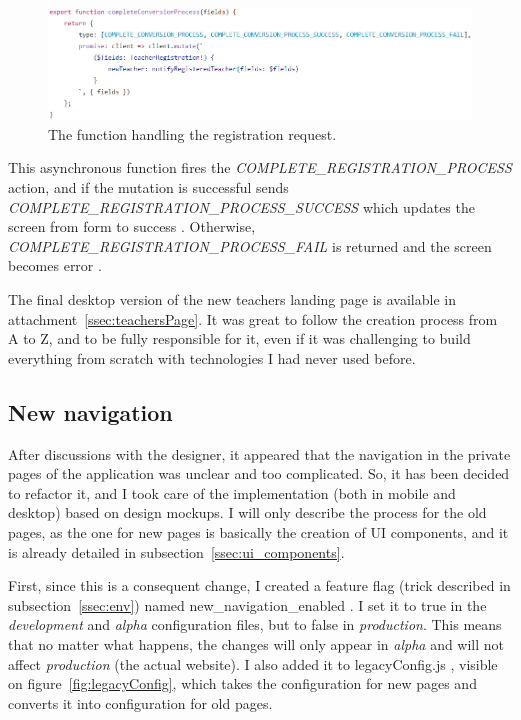 \begin{figure}[H]
    \centering
    \includegraphics[scale=0.8]{figure/completeRegistration.png}
    \caption{The function handling the registration request.}
    \label{fig:completeRegistration}
\end{figure}

This asynchronous function fires the \textit{COMPLETE\_REGISTRATION\_PROCESS} action, and if the mutation is successful sends \textit{COMPLETE\_REGISTRATION\_PROCESS\_SUCCESS} which updates the screen from \guillemotleft{} form \guillemotright{} to \guillemotleft{} success \guillemotright{}. Otherwise, \textit{COMPLETE\_REGISTRATION\_PROCESS\_FAIL} is returned and the screen becomes \guillemotleft{} error \guillemotright{}.

The final desktop version of the new teachers landing page is available in {\sc attachment}~\ref{ssec:teachersPage}. It was great to follow the creation process from A to Z, and to be fully responsible for it, even if it was challenging to build everything from scratch with technologies I had never used before.

\subsection{New navigation}
\label{ssec:new_nav}

After discussions with the designer, it appeared that the navigation in the private pages of the application was unclear and too complicated. So, it has been decided to refactor it, and I took care of the implementation (both in mobile and desktop) based on design mockups. I will only describe the process for the old pages, as the one for new pages is basically the creation of UI components, and it is already detailed in {\sc subsection}~\ref{ssec:ui_components}.

First, since this is a consequent change, I created a feature flag (trick described in {\sc subsection}~\ref{ssec:env}) named \guillemotleft{} new\_navigation\_enabled \guillemotright{}. I set it to true in the \textit{development} and \textit{alpha} configuration files, but to false in \textit{production}. This means that no matter what happens, the changes will only appear in \textit{alpha} and will not affect \textit{production} (the actual website). I also added it to \guillemotleft{} legacyConfig.js \guillemotright{}, visible on {\sc figure}~\ref{fig:legacyConfig}, which takes the configuration for new pages and converts it into configuration for old pages.

